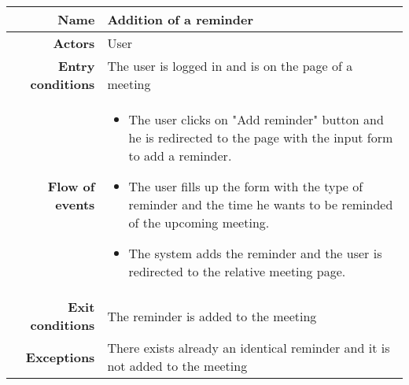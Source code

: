 \begin{center}
\begin{tabular}{r|p{7cm}}
\bf\large Name&\bf\large Addition of a reminder\\
\hline
\hline
\bf Actors&User\\
\hline
\bf Entry conditions&The user is logged in and is on the page of a meeting\\
\hline
\bf Flow of events&
\begin{itemize}
\item The user clicks on "Add reminder" button and he is redirected to the page with the input form to add a reminder.

\item The user fills up the form with the type of reminder and the time he wants to be reminded of the upcoming meeting.

\item  The system adds the reminder and the user is redirected to the relative meeting page.

\end{itemize}
\\
\hline
\bf Exit conditions&The reminder is added to the meeting \\
\hline
\bf Exceptions&There exists already an identical reminder and it is not added to the meeting\\
\hline

\end{tabular}
\end{center}